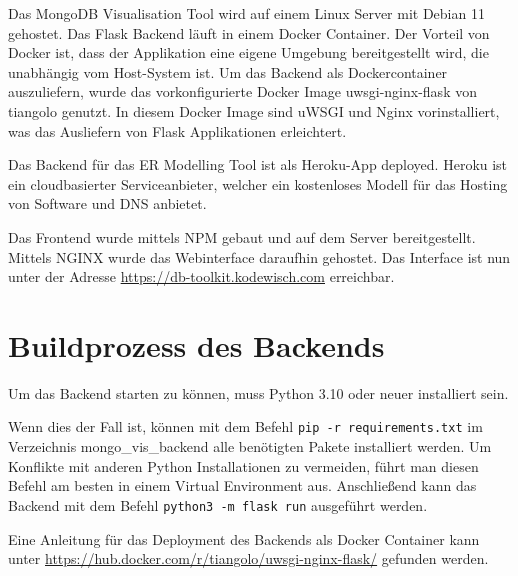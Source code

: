 \iffalse
Aufgabe des Kapitels Inbetriebnahme ist es, die Überführung der in 
Kapitel \ref{cha:implementierung} entwickelte Lösung in das betriebliche 
Umfeld aufzuzeigen. Dabei wird beispielsweise die Inbetriebnahme eines 
Programms beschrieben oder die Integration eines erstellten 
Programmodules dargestellt.

Bei der Software-Erstellung entspricht dieses Kapitel der 
Auslieferungsphase (Deployment) im \ac{rup}.
\fi

Das MongoDB Visualisation Tool wird auf einem Linux Server mit Debian 11 gehostet.
Das Flask Backend läuft in einem Docker Container.
Der Vorteil von Docker ist, dass der Applikation eine eigene Umgebung bereitgestellt wird, die unabhängig vom Host-System ist.
Um das Backend als Dockercontainer auszuliefern, wurde das vorkonfigurierte Docker Image uwsgi-nginx-flask von tiangolo genutzt.
In diesem Docker Image sind uWSGI und Nginx vorinstalliert, was das Ausliefern von Flask Applikationen erleichtert.
~\autocite{tiangolo:uwsgi-nginx-flask}

Das Backend für das ER Modelling Tool ist als Heroku-App deployed.
Heroku ist ein cloudbasierter Serviceanbieter, welcher ein kostenloses Modell für das Hosting von Software und DNS anbietet.
~\autocite{heroku:heroku}

Das Frontend wurde mittels NPM gebaut und auf dem Server bereitgestellt.
Mittels NGINX wurde das Webinterface daraufhin gehostet. 
Das Interface ist nun unter der Adresse \url{https://db-toolkit.kodewisch.com} erreichbar.

\section{Buildprozess des Backends}
\label{sec:build_backend}

Um das Backend starten zu können, muss Python 3.10 oder neuer installiert sein.

Wenn dies der Fall ist, können mit dem Befehl \lstinline{pip -r requirements.txt} im Verzeichnis mongo\_vis\_backend alle benötigten Pakete installiert werden.
Um Konflikte mit anderen Python Installationen zu vermeiden, führt man diesen Befehl am besten in einem Virtual Environment aus.
Anschließend kann das Backend mit dem Befehl \lstinline{python3 -m flask run} ausgeführt werden.

Eine Anleitung für das Deployment des Backends als Docker Container kann unter \url{https://hub.docker.com/r/tiangolo/uwsgi-nginx-flask/} gefunden werden.

